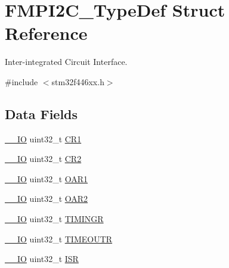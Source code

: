 \hypertarget{struct_f_m_p_i2_c___type_def}{}\section{F\+M\+P\+I2\+C\+\_\+\+Type\+Def Struct Reference}
\label{struct_f_m_p_i2_c___type_def}


Inter-\/integrated Circuit Interface.  




{\ttfamily \#include $<$stm32f446xx.\+h$>$}

\subsection*{Data Fields}
\begin{DoxyCompactItemize}
\item 
\mbox{\hyperlink{core__sc300_8h_aec43007d9998a0a0e01faede4133d6be}{\+\_\+\+\_\+\+IO}} uint32\+\_\+t \mbox{\hyperlink{struct_f_m_p_i2_c___type_def_ab0ec7102960640751d44e92ddac994f0}{C\+R1}}
\item 
\mbox{\hyperlink{core__sc300_8h_aec43007d9998a0a0e01faede4133d6be}{\+\_\+\+\_\+\+IO}} uint32\+\_\+t \mbox{\hyperlink{struct_f_m_p_i2_c___type_def_afdfa307571967afb1d97943e982b6586}{C\+R2}}
\item 
\mbox{\hyperlink{core__sc300_8h_aec43007d9998a0a0e01faede4133d6be}{\+\_\+\+\_\+\+IO}} uint32\+\_\+t \mbox{\hyperlink{struct_f_m_p_i2_c___type_def_a08b4be0d626a00f26bc295b379b3bba6}{O\+A\+R1}}
\item 
\mbox{\hyperlink{core__sc300_8h_aec43007d9998a0a0e01faede4133d6be}{\+\_\+\+\_\+\+IO}} uint32\+\_\+t \mbox{\hyperlink{struct_f_m_p_i2_c___type_def_ab5c57ffed0351fa064038939a6c0bbf6}{O\+A\+R2}}
\item 
\mbox{\hyperlink{core__sc300_8h_aec43007d9998a0a0e01faede4133d6be}{\+\_\+\+\_\+\+IO}} uint32\+\_\+t \mbox{\hyperlink{struct_f_m_p_i2_c___type_def_a5576a30ffbe0a0800ce7788610327677}{T\+I\+M\+I\+N\+GR}}
\item 
\mbox{\hyperlink{core__sc300_8h_aec43007d9998a0a0e01faede4133d6be}{\+\_\+\+\_\+\+IO}} uint32\+\_\+t \mbox{\hyperlink{struct_f_m_p_i2_c___type_def_a95187d83f061ebbddd8668d0db3fbaa5}{T\+I\+M\+E\+O\+U\+TR}}
\item 
\mbox{\hyperlink{core__sc300_8h_aec43007d9998a0a0e01faede4133d6be}{\+\_\+\+\_\+\+IO}} uint32\+\_\+t \mbox{\hyperlink{struct_f_m_p_i2_c___type_def_ab3c49a96815fcbee63d95e1e74f20e75}{I\+SR}}
\item 

\end{DoxyCompactItemize}
